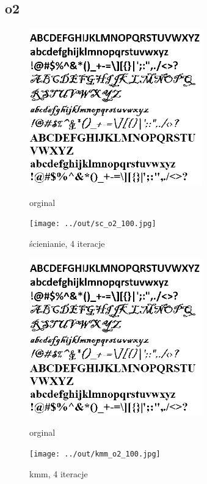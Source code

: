 \documentclass[a4paper,12pt]{article}
\begin{document}
\newpage
\subsection{o2}

\begin{figure}[h!]
\begin{minipage}[t]{7.5cm}
\begin{center}
\includegraphics[width=7.5cm]{../in/o2.jpg}
\caption{orginal}
\end{center}
\end{minipage}
\hfill
\begin{minipage}[t]{7.5cm}
\begin{center}
\texttt{[image: ../out/sc\_o2\_100.jpg]}
\caption{ścienianie, 4 iteracje}
\end{center}
\end{minipage}
\end{figure}

\begin{figure}[h!]
\begin{minipage}[t]{7.5cm}
\begin{center}
\includegraphics[width=7.5cm]{../in/o2.jpg}
\caption{orginal}
\end{center}
\end{minipage}
\hfill
\begin{minipage}[t]{7.5cm}
\begin{center}
\texttt{[image: ../out/kmm\_o2\_100.jpg]}
\caption{kmm, 4 iteracje}
\end{center}
\end{minipage}
\end{figure}
\end{document}
